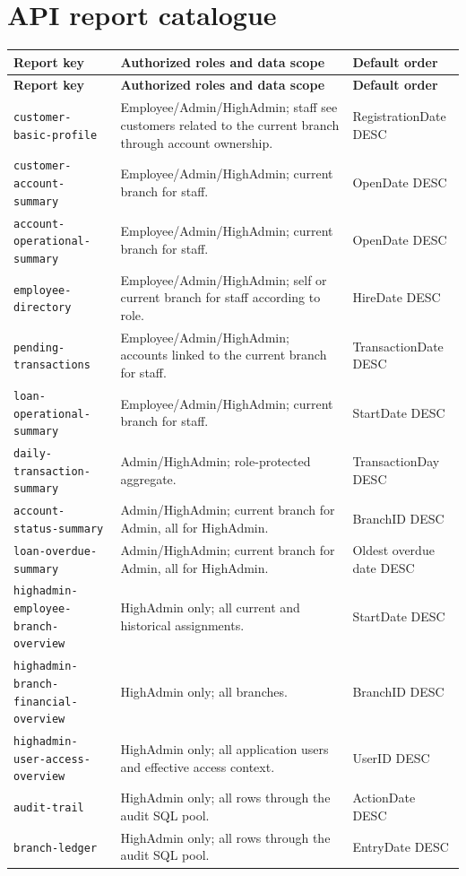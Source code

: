\documentclass[11pt,a4paper,oneside]{report}
\begin{document}
\section{API report catalogue}
{\footnotesize
\setlength{\tabcolsep}{4pt}
\renewcommand{\arraystretch}{1.10}
\begin{longtable}{L{0.27\textwidth}L{0.45\textwidth}L{0.20\textwidth}}
\toprule\textbf{Report key} & \textbf{Authorized roles and data scope} & \textbf{Default order}\\\midrule\endfirsthead
\toprule\textbf{Report key} & \textbf{Authorized roles and data scope} & \textbf{Default order}\\\midrule\endhead
\nolinkurl{customer-basic-profile} & Employee\slash Admin\slash HighAdmin; staff see customers related to the current branch through account ownership. & RegistrationDate DESC\\
\nolinkurl{customer-account-summary} & Employee\slash Admin\slash HighAdmin; current branch for staff. & OpenDate DESC\\
\nolinkurl{account-operational-summary} & Employee\slash Admin\slash HighAdmin; current branch for staff. & OpenDate DESC\\
\nolinkurl{employee-directory} & Employee\slash Admin\slash HighAdmin; self or current branch for staff according to role. & HireDate DESC\\
\nolinkurl{pending-transactions} & Employee\slash Admin\slash HighAdmin; accounts linked to the current branch for staff. & TransactionDate DESC\\
\nolinkurl{loan-operational-summary} & Employee\slash Admin\slash HighAdmin; current branch for staff. & StartDate DESC\\
\nolinkurl{daily-transaction-summary} & Admin\slash HighAdmin; role-protected aggregate. & TransactionDay DESC\\
\nolinkurl{account-status-summary} & Admin\slash HighAdmin; current branch for Admin, all for HighAdmin. & BranchID DESC\\
\nolinkurl{loan-overdue-summary} & Admin\slash HighAdmin; current branch for Admin, all for HighAdmin. & Oldest overdue date DESC\\
\texttt{highadmin-employee-}\newline\texttt{branch-overview} & HighAdmin only; all current and historical assignments. & StartDate DESC\\
\texttt{highadmin-branch-}\newline\texttt{financial-overview} & HighAdmin only; all branches. & BranchID DESC\\
\texttt{highadmin-user-access-}\newline\texttt{overview} & HighAdmin only; all application users and effective access context. & UserID DESC\\
\nolinkurl{audit-trail} & HighAdmin only; all rows through the audit SQL pool. & ActionDate DESC\\
\nolinkurl{branch-ledger} & HighAdmin only; all rows through the audit SQL pool. & EntryDate DESC\\
\bottomrule
\end{longtable}
}
\end{document}
